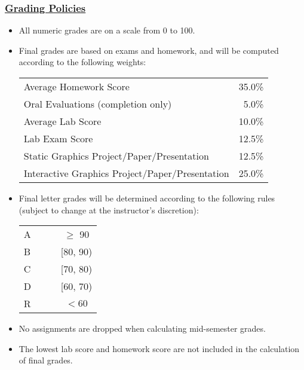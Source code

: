 \documentclass[11pt]{article}
\begin{document}
\subsubsection*{\underline{Grading Policies}}
\begin{itemize}
\item All numeric grades are on a scale from 0 to 100.

\item Final grades are based on exams and homework, and will be computed according to the following weights:
\begin{center}
\begin{tabular}{lr}
Average Homework Score & 35.0\%\\
Oral Evaluations (completion only) & 5.0\%\\
Average Lab Score & 10.0\%\\
Lab Exam Score & 12.5\%\\
Static Graphics Project/Paper/Presentation & 12.5\%\\
Interactive Graphics Project/Paper/Presentation & 25.0\%\\
\end{tabular}
\end{center}


\item Final letter grades will be determined according to the following rules (subject to change at the instructor's discretion):
\begin{center}
\begin{tabular}{lcc}
A  	& $\;\;\;\;$		& $\geq$ 90\\
B  	& $\;\;\;\;$		& [80, 90)\\
C  & $\;\;\;\;$	 & [70, 80)\\
D  & $\;\;\;\;$	 & [60, 70)\\
R  & $\;\;\;\;$	 & $< 60$\\
\end{tabular}
\end{center}

\item {No assignments are dropped when calculating mid-semester grades.}  

\item {The lowest lab score and homework score are not included in the calculation of final grades.}    

\end{itemize}
\end{document}
